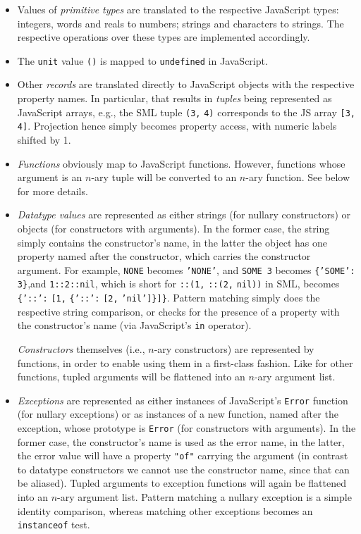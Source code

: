 \documentclass[twoside,titlepage]{article}
\begin{document}
\begin{itemize}
\setlength{\parskip}{0ex}

\item Values of {\em primitive types} are translated to the respective JavaScript types: integers, words and reals to numbers; strings and characters to strings. The respective operations over these types are implemented accordingly.

\item The {\tt unit} value {\tt ()} is mapped to {\tt undefined} in JavaScript.

\item Other {\em records} are translated directly to JavaScript objects with the respective property names. In particular, that results in {\em tuples} being represented as JavaScript arrays, e.g., the SML tuple {\tt (3,} {\tt 4)} corresponds to the JS array {\tt [3,} {\tt 4]}. Projection hence simply becomes property access, with numeric labels shifted by 1.

\item {\em Functions} obviously map to JavaScript functions. However, functions whose argument is an $n$-ary tuple will be converted to an $n$-ary function. See below for more details.

\item {\em Datatype values} are represented as either strings (for nullary constructors) or objects (for constructors with arguments). In the former case, the string simply contains the constructor's name, in the latter the object has one property named after the constructor, which carries the constructor argument. For example, {\tt NONE} becomes {\tt 'NONE'}, and {\tt SOME 3} becomes {\tt \{'SOME':} {\tt 3\}},and {\tt 1::2::nil}, which is short for {\tt ::(1,} {\tt ::(2,} {\tt nil))} in SML, becomes {\tt \{'::':} {\tt [1,} {\tt \{'::':} {\tt [2,} {\tt 'nil']\}]\}}. Pattern matching simply does the respective string comparison, or checks for the presence of a property with the constructor's name (via JavaScript's {\tt in} operator).

{\em Constructors} themselves (i.e., $n$-ary constructors) are represented by functions, in order to enable using them in a first-class fashion. Like for other functions, tupled arguments will be flattened into an $n$-ary argument list.

\item {\em Exceptions} are represented as either instances of JavaScript's {\tt Error} function (for nullary exceptions) or as instances of a new function, named after the exception, whose prototype is {\tt Error} (for constructors with arguments). In the former case, the constructor's name is used as the error name, in the latter, the error value will have a property {\tt "of"} carrying the argument (in contrast to datatype constructors we cannot use the constructor name, since that can be aliased). Tupled arguments to exception functions will again be flattened into an $n$-ary argument list. Pattern matching a nullary exception is a simple identity comparison, whereas matching other exceptions becomes an {\tt instanceof} test.


\end{itemize}
\end{document}
